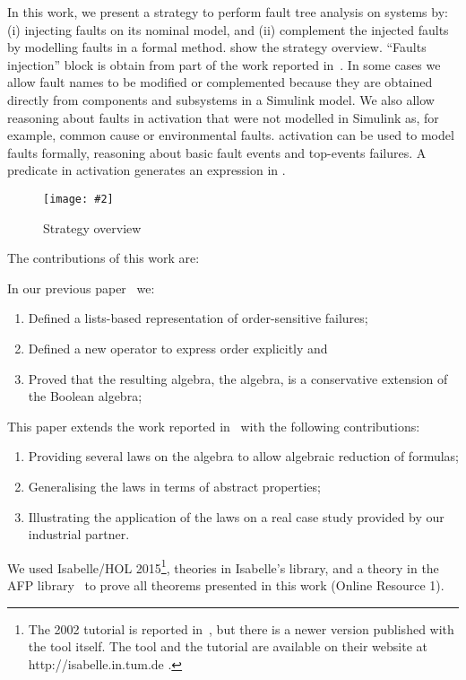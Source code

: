 \documentclass[en,twoside,onehalfspacing,phd]{risethesis}
\makeatletter
\newcommand{\todo}[1]{\@latex@warning{TODO #1}}
\newcommand{\includegraphicsaspectratio}[2][1]{%
  \texttt{[image: \#2]}%
}
\makeatother
\begin{document}
In this work, we present a strategy to perform fault tree analysis on systems by: (i) injecting faults on its nominal model, and (ii) complement the injected faults by modelling faults in a formal method.
 show the strategy overview.
``Faults injection'' block is obtain from part of the work reported in~\cite{Didier2012}. 
In some cases we allow fault names to be modified or complemented because they are obtained directly from components and subsystems in a Simulink model.
We also allow reasoning about faults in \ac{activation} that were not modelled in Simulink as, for example, common cause or environmental faults.
\Ac{activation} can be used to model faults formally, reasoning about basic fault events and top-events failures.
A predicate in \ac{activation} generates an expression in .


\begin{figure}[t]
  \centering
  \includegraphicsaspectratio[0.8]{StrategyOverview}
  \caption{Strategy overview}
  \label{fig:strategy-overview}
\end{figure}

The contributions of this work are:

In our previous paper~\cite{DM2015} we:
\begin{enumerate}
  \item Defined a lists-based representation of order-sensitive failures;
  \item Defined a new operator to express order explicitly and
  \item Proved that the resulting algebra, the \ac{algebra}, is a conservative extension of the Boolean algebra;
\end{enumerate}

This paper extends the work reported in~\cite{DM2015} with the following contributions:
\begin{enumerate}
  \item Providing several laws on the \ac{algebra} to allow algebraic reduction of formulas;
  \item Generalising the laws in terms of abstract properties;
  \item Illustrating the application of the laws on a real case study provided by our industrial partner.
\end{enumerate}

We used Isabelle/HOL 2015\footnote{The 2002 tutorial is reported in~\cite{NPW2002}, but there is a newer version published with the tool itself.
The tool and the tutorial are available on their website at http://isabelle.in.tum.de .}, theories in Isabelle's library, and a theory in the AFP library~\cite{JM2005} to prove all theorems presented in this work (Online Resource 1).
\end{document}
